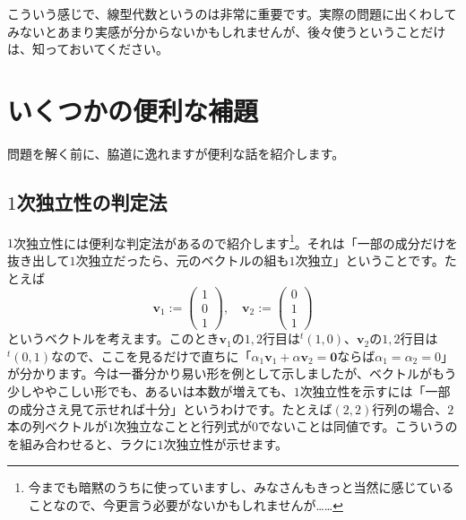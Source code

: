こういう感じで、線型代数というのは非常に重要です。実際の問題に出くわしてみないとあまり実感が分からないかもしれませんが、後々使うということだけは、知っておいてください。

\section{いくつかの便利な補題}

問題を解く前に、脇道に逸れますが便利な話を紹介します。

\subsection{$1$次独立性の判定法}

$1$次独立性には便利な判定法があるので紹介します\footnote{今までも暗黙のうちに使っていますし、みなさんもきっと当然に感じていることなので、今更言う必要がないかもしれませんが……}。それは「一部の成分だけを抜き出して$1$次独立だったら、元のベクトルの組も$1$次独立」ということです。たとえば
\[
\bm{v}_1 :=
\begin{pmatrix}
1 \\
0 \\
1
\end{pmatrix}, \quad
\bm{v}_2 :=
\begin{pmatrix}
0 \\
1 \\
1
\end{pmatrix}
\]
というベクトルを考えます。このとき$\bm{v}_1$の$1, 2$行目は${}^t(1, 0)$、$\bm{v}_2$の$1, 2$行目は${}^t (0, 1)$なので、ここを見るだけで直ちに「$\alpha_1 \bm{v}_1 + \alpha \bm{v}_2 = \bm{0}$ならば$\alpha_1 = \alpha_2 = 0$」が分かります。今は一番分かり易い形を例として示しましたが、ベクトルがもう少しややこしい形でも、あるいは本数が増えても、$1$次独立性を示すには「一部の成分さえ見て示せれば十分」というわけです。たとえば$(2, 2)$行列の場合、$2$本の列ベクトルが$1$次独立なことと行列式が$0$でないことは同値です。こういうのを組み合わせると、ラクに$1$次独立性が示せます。

